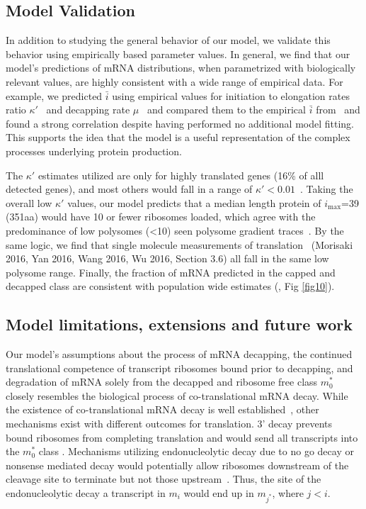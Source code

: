 \documentclass[10pt,letterpaper]{article}
\newcommand{\imax}{\ensuremath{{i_{\max}}}\xspace}
\newcommand{\MRL}{\ensuremath{\bar{i}}\xspace}
\begin{document}
\subsection*{Model Validation}

In addition to studying the general behavior of our model, we validate this behavior using empirically based parameter values.
In general, we find that our model's predictions of mRNA distributions, when parametrized with biologically relevant values, are highly consistent with a wide range of empirical data.
For example, we predicted \MRL using empirical values for initiation to elongation rates ratio $\kappa'$~\cite{RN13} and decapping rate $\mu$~\cite{RN27} and compared them to the empirical \MRL from~\cite{RN29} and found a strong correlation despite having performed no additional model fitting. This supports the idea that the model is a useful representation of the complex processes underlying protein production.

The $\kappa'$ estimates utilized are only for highly translated genes (16\% of alll detected genes), and most others would fall in a range of $\kappa'<0.01$~\cite{RN13}.
Taking the overall low $\kappa'$ values, our model predicts that a median length protein of \imax =39 (351aa) would have 10 or fewer ribosomes loaded, which agree with the predominance of low polysomes (<10) seen polysome gradient traces~\cite{RN35, RN36}. 
By the same logic, we find that single molecule measurements of translation~\cite{RN30,RN32,RN33,RN31} (Morisaki 2016, Yan 2016, Wang 2016, Wu 2016, Section 3.6) all fall in the same low polysome range.
Finally, the fraction of mRNA predicted in the capped and decapped class  are consistent with population wide estimates (\cite{RN4}, Fig \ref{fig10}). 


\subsection*{Model limitations, extensions and future work}

Our model's assumptions about the process of mRNA decapping, the continued translational competence of transcript ribosomes bound prior to decapping, and degradation of mRNA solely from the decapped and ribosome free class $m_0^*$  closely resembles the biological process of co-translational mRNA decay. While the existence of co-translational mRNA decay is well established~\cite{RN4,RN28}, other mechanisms exist with different outcomes for translation. 3' decay prevents bound ribosomes from completing translation and would send all transcripts into the $m_0^*$ class . Mechanisms utilizing endonucleolytic decay due to no go decay or nonsense mediated decay would potentially allow ribosomes downstream of the cleavage site to terminate but not those upstream~\cite{RN38,RN2}. Thus,  the site of the endonucleolytic decay a transcript in $m_i$ would end up in $m_{j^*}$, where $j < i$.
\end{document}

